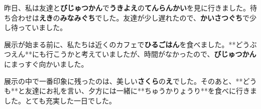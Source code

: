 昨日、私は友達と\textbf{びじゅつかん}で\textbf{うきよえ}の\textbf{てんらんかい}を見に行きました。待ち合わせは\textbf{えき}の\textbf{みなみぐち}でした。友達が少し遅れたので、\textbf{かいさつぐち}で少し待っていました。

展示が始まる前に、私たちは近くのカフェで\textbf{ひるごはん}を食べました。**どうぶつえん**にも行こうかと考えていましたが、時間がなかったので、\textbf{びじゅつかん}にまっすぐ向かいました。

展示の中で一番印象に残ったのは、美しい\textbf{さくら}の\textbf{え}でした。そのあと、**どうも**と友達にお礼を言い、夕方には一緒に**ちゅうかりょうり**を食べに行きました。とても充実した一日でした。

